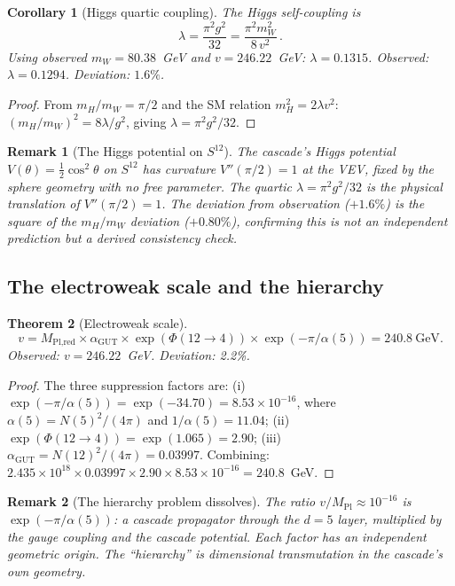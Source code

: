 \documentclass[12pt,a4paper]{article}
\newtheorem{theorem}{Theorem}[section]
\newtheorem{corollary}[theorem]{Corollary}
\newtheorem*{remark}{Remark}
\begin{document}
\begin{corollary}[Higgs quartic coupling]
The Higgs self-coupling is
\[
\lambda = \frac{\pi^2 g^2}{32} = \frac{\pi^2 m_W^2}{8\,v^2}\,.
\]
Using observed $m_W = 80.38$~GeV and $v = 246.22$~GeV: $\lambda = 0.1315$. Observed: $\lambda = 0.1294$. Deviation: $1.6\%$.
\end{corollary}

\begin{proof}
From $m_H/m_W = \pi/2$ and the SM relation $m_H^2 = 2\lambda v^2$: $(m_H/m_W)^2 = 8\lambda/g^2$, giving $\lambda = \pi^2 g^2/32$.
\end{proof}

\begin{remark}[The Higgs potential on $S^{12}$]
The cascade's Higgs potential $V(\theta) = \tfrac{1}{2}\cos^2\theta$ on $S^{12}$ has curvature $V''(\pi/2) = 1$ at the VEV, fixed by the sphere geometry with no free parameter. The quartic $\lambda = \pi^2 g^2/32$ is the physical translation of $V''(\pi/2) = 1$. The deviation from observation ($+1.6\%$) is the square of the $m_H/m_W$ deviation ($+0.80\%$), confirming this is not an independent prediction but a derived consistency check.
\end{remark}

\subsection{The electroweak scale and the hierarchy}

\begin{theorem}[Electroweak scale]
\[
v = M_{\text{Pl,red}} \times \alpha_{\text{GUT}} \times \exp(\Phi(12 \to 4)) \times \exp(-\pi/\alpha(5)) = 240.8~\text{GeV}.
\]
Observed: $v = 246.22$~GeV. Deviation: 2.2\%.
\end{theorem}

\begin{proof}
The three suppression factors are: (i) $\exp(-\pi/\alpha(5)) = \exp(-34.70) = 8.53 \times 10^{-16}$, where $\alpha(5) = N(5)^2/(4\pi)$ and $1/\alpha(5) = 11.04$; (ii) $\exp(\Phi(12 \to 4)) = \exp(1.065) = 2.90$; (iii) $\alpha_{\text{GUT}} = N(12)^2/(4\pi) = 0.03997$. Combining: $2.435 \times 10^{18} \times 0.03997 \times 2.90 \times 8.53 \times 10^{-16} = 240.8$~GeV.
\end{proof}

\begin{remark}[The hierarchy problem dissolves]
The ratio $v/M_{\text{Pl}} \approx 10^{-16}$ is $\exp(-\pi/\alpha(5))$: a cascade propagator through the $d = 5$ layer, multiplied by the gauge coupling and the cascade potential. Each factor has an independent geometric origin. The ``hierarchy'' is dimensional transmutation in the cascade's own geometry.
\end{remark}
\end{document}
